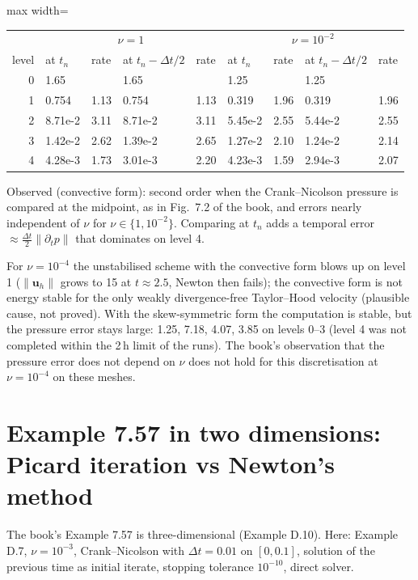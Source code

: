 \documentclass[11pt,a4paper]{article}
\newcommand{\bu}{\boldsymbol{u}}
\newcommand{\dt}{\Delta t}
\begin{document}
\begin{center}\begin{adjustbox}{max width=\textwidth}
\begin{tabular}{rllllllll}
\toprule
& \multicolumn{4}{c}{$\nu=1$} & \multicolumn{4}{c}{$\nu=10^{-2}$}\\
level & at $t_n$ & rate & at $t_n-\dt/2$ & rate & at $t_n$ & rate & at $t_n-\dt/2$ & rate\\
\midrule
0 & 1.65 & & 1.65 & & 1.25 & & 1.25 &\\
1 & 0.754 & 1.13 & 0.754 & 1.13 & 0.319 & 1.96 & 0.319 & 1.96\\
2 & 8.71e-2 & 3.11 & 8.71e-2 & 3.11 & 5.45e-2 & 2.55 & 5.44e-2 & 2.55\\
3 & 1.42e-2 & 2.62 & 1.39e-2 & 2.65 & 1.27e-2 & 2.10 & 1.24e-2 & 2.14\\
4 & 4.28e-3 & 1.73 & 3.01e-3 & 2.20 & 4.23e-3 & 1.59 & 2.94e-3 & 2.07\\
\bottomrule
\end{tabular}
\end{adjustbox}\end{center}
Observed (convective form): second order when the Crank--Nicolson pressure is compared at the midpoint, as in Fig.~7.2
of the book, and errors nearly independent of $\nu$ for $\nu\in\{1,10^{-2}\}$. Comparing at $t_n$ adds a temporal error
$\approx\frac{\dt}{2}\|\partial_tp\|$ that dominates on level 4.

For $\nu=10^{-4}$ the unstabilised scheme with the convective form blows up on level 1 ($\|\bu_h\|$ grows to 15 at
$t\approx2.5$, Newton then fails); the convective form is not energy stable for the only weakly divergence-free
Taylor--Hood velocity (plausible cause, not proved). With the skew-symmetric form the computation is stable, but the
pressure error stays large: 1.25, 7.18, 4.07, 3.85 on levels 0--3 (level 4 was not completed within the 2\,h limit
of the runs). The book's observation that the pressure error does not depend on $\nu$ does not hold for this
discretisation at $\nu=10^{-4}$ on these meshes.

\section{Example 7.57 in two dimensions: Picard iteration vs Newton's method}

The book's Example 7.57 is three-dimensional (Example D.10). Here: Example D.7, $\nu=10^{-3}$, Crank--Nicolson with
$\dt=0.01$ on $[0,0.1]$, solution of the previous time as initial iterate, stopping tolerance $10^{-10}$, direct solver.
\end{document}
